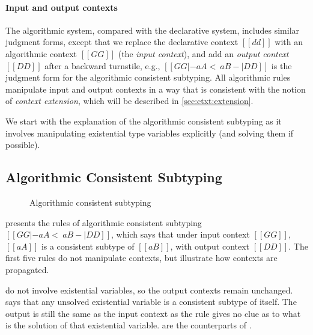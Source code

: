 \paragraph{Input and output contexts}
The algorithmic system, compared with the declarative system, includes similar
judgment forms, except that we replace the declarative context $[[dd]]$ with an
algorithmic context $[[GG]]$ (the \emph{input context}), and add an
\emph{output context} $[[DD]]$ after a backward turnstile, e.g.,
$[[  GG |- aA <~ aB -| DD  ]]$ is the judgment form for the
algorithmic consistent subtyping. All algorithmic rules manipulate input and
output contexts in a way that is consistent with the notion of
\emph{context extension}, which will be described in \cref{sec:ctxt:extension}.

We start with the explanation of the algorithmic consistent subtyping as it
involves manipulating existential type variables explicitly (and solving them if
possible).

\subsection{Algorithmic Consistent Subtyping}
\label{sec:algo:subtype}

\begin{figure}[t]
  \centering
  \begin{small}


  \end{small}
  \caption{Algorithmic consistent subtyping}
  \label{fig:algo:subtype}
\end{figure}

 presents the rules of algorithmic consistent subtyping
$[[GG |- aA <~ aB -| DD ]]$, which says that under input context $[[GG]]$,
$[[aA]]$ is a consistent subtype of $[[aB]]$, with output context $[[DD]]$. The
first five rules do not manipulate contexts, but illustrate how contexts are
propagated.

 do not involve existential variables, so the output
contexts remain unchanged.  says that any unsolved existential
variable is a consistent subtype of itself. The output is still the same as the
input context as the rule gives no clue as to what is the solution of that
existential variable.  are the 
counterparts of .

